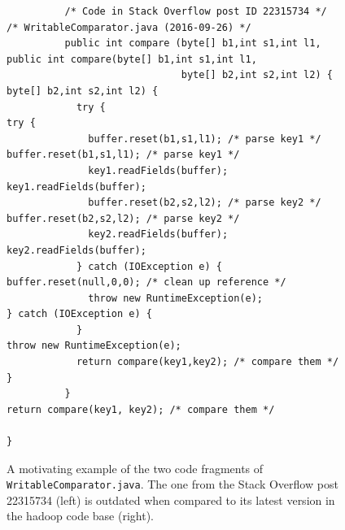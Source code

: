 \documentclass[sigconf,review, anonymous]{acmart}
\begin{document}
\begin{figure}
	\begin{lstlisting}
          /* Code in Stack Overflow post ID 22315734 */                  /* WritableComparator.java (2016-09-26) */
          public int compare (byte[] b1,int s1,int l1,                   public int compare(byte[] b1,int s1,int l1,
                              byte[] b2,int s2,int l2) {                                    byte[] b2,int s2,int l2) {
            try {                                                          try {
              buffer.reset(b1,s1,l1); /* parse key1 */                       buffer.reset(b1,s1,l1); /* parse key1 */
              key1.readFields(buffer);                                       key1.readFields(buffer);
              buffer.reset(b2,s2,l2); /* parse key2 */                       buffer.reset(b2,s2,l2); /* parse key2 */
              key2.readFields(buffer);                                       key2.readFields(buffer);
            } catch (IOException e) {                                        buffer.reset(null,0,0); /* clean up reference */
              throw new RuntimeException(e);                               } catch (IOException e) {
            }                                                                throw new RuntimeException(e);
            return compare(key1,key2); /* compare them */                  }
          }                                                                return compare(key1, key2); /* compare them */
	                                                                       }
	\end{lstlisting}
	\caption{A motivating example of the two code fragments of
          {\small\texttt{WritableComparator.java}}. The one from the
          Stack Overflow post 22315734 (left) is outdated when compared to
          its latest version in the \textsf{hadoop} code base
          (right).}
	\label{fig:before-after}
\end{figure}
\end{document}
